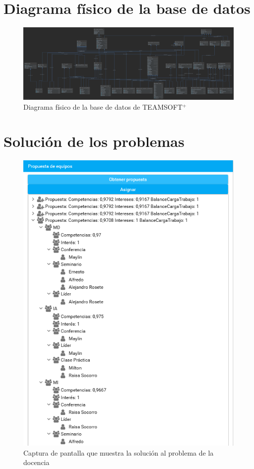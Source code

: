 {\chapter{Diagrama físico de la base de datos}
\begin{figure}[H]
	\centering
	\includegraphics[width=\textwidth]{figuras/diagrama-base-datos.png}
	\caption{Diagrama físico de la base de datos de TEAMSOFT$^+$} \label{fig:diagrama-bd}
\end{figure}

\chapter{Solución de los problemas}

\begin{figure}[H]
	\centering
	\includegraphics[width=.5\textwidth]{figuras/docencia_solucion.png}
	\caption{Captura de pantalla que muestra la solución al problema de la docencia} \label{fig:solucion-docencia}
\end{figure}

}
